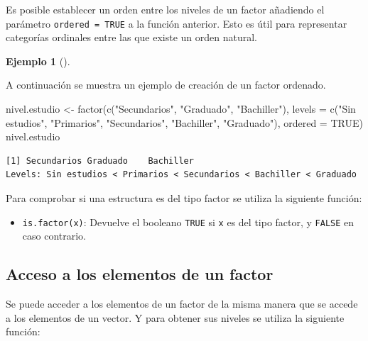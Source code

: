 \documentclass[
  a4paper,
]{scrreport}
\newenvironment{Shaded}{\begin{snugshade}}{\end{snugshade}}
\newcommand{\AttributeTok}[1]{\textcolor[rgb]{0.40,0.45,0.13}{#1}}
\newcommand{\ConstantTok}[1]{\textcolor[rgb]{0.56,0.35,0.01}{#1}}
\newcommand{\FunctionTok}[1]{\textcolor[rgb]{0.28,0.35,0.67}{#1}}
\newcommand{\NormalTok}[1]{\textcolor[rgb]{0.00,0.23,0.31}{#1}}
\newcommand{\OtherTok}[1]{\textcolor[rgb]{0.00,0.23,0.31}{#1}}
\newcommand{\StringTok}[1]{\textcolor[rgb]{0.13,0.47,0.30}{#1}}
\providecommand{\tightlist}{%
  \setlength{\itemsep}{0pt}\setlength{\parskip}{0pt}}\usepackage{longtable,booktabs,array}
\theoremstyle{definition}
\newtheorem{example}{Ejemplo}[chapter]
\theoremstyle{definition}
\theoremstyle{remark}
\begin{document}
Es posible establecer un orden entre los niveles de un factor añadiendo
el parámetro \texttt{ordered\ =\ TRUE} a la función anterior. Esto es
útil para representar categorías ordinales entre las que existe un orden
natural.

\leavevmode{}%
\begin{example}[]\label{exm-creacion-factor-ordenado}

A continuación se muestra un ejemplo de creación de un factor ordenado.

\begin{Shaded}
\begin{Highlighting}[]
\NormalTok{nivel.estudio }\OtherTok{\textless{}{-}} \FunctionTok{factor}\NormalTok{(}\FunctionTok{c}\NormalTok{(}\StringTok{"Secundarios"}\NormalTok{, }\StringTok{"Graduado"}\NormalTok{, }\StringTok{"Bachiller"}\NormalTok{), }\AttributeTok{levels =} \FunctionTok{c}\NormalTok{(}\StringTok{"Sin estudios"}\NormalTok{, }\StringTok{"Primarios"}\NormalTok{, }\StringTok{"Secundarios"}\NormalTok{, }\StringTok{"Bachiller"}\NormalTok{, }\StringTok{"Graduado"}\NormalTok{), }\AttributeTok{ordered =} \ConstantTok{TRUE}\NormalTok{)}
\NormalTok{nivel.estudio}
\end{Highlighting}
\end{Shaded}

\begin{verbatim}
[1] Secundarios Graduado    Bachiller  
Levels: Sin estudios < Primarios < Secundarios < Bachiller < Graduado
\end{verbatim}

\end{example}

Para comprobar si una estructura es del tipo factor se utiliza la
siguiente función:

\begin{itemize}
\tightlist
\item
  \texttt{is.factor(x)}: Devuelve el booleano \texttt{TRUE} si
  \texttt{x} es del tipo factor, y \texttt{FALSE} en caso contrario.
\end{itemize}

\hypertarget{acceso-a-los-elementos-de-un-factor}{%
\subsection{Acceso a los elementos de un
factor}\label{acceso-a-los-elementos-de-un-factor}}

Se puede acceder a los elementos de un factor de la misma manera que se
accede a los elementos de un vector. Y para obtener sus niveles se
utiliza la siguiente función:
\end{document}
